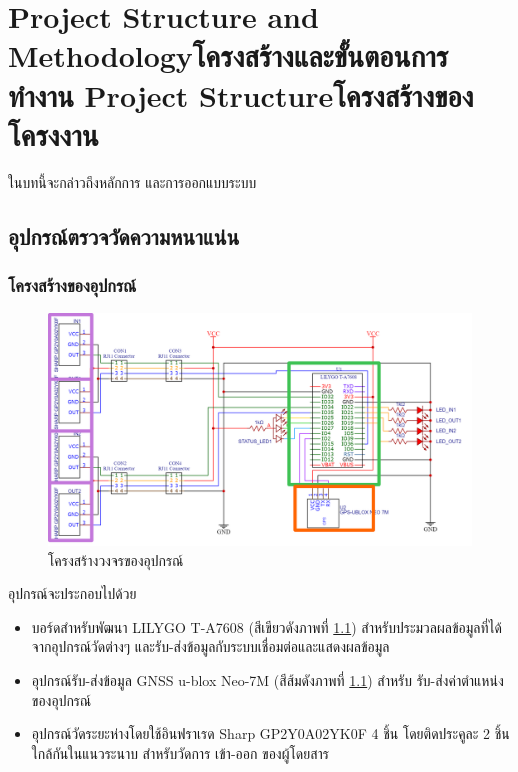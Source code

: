 \chapter{\ifproject%
\ifenglish Project Structure and Methodology\else โครงสร้างและขั้นตอนการทำงาน\fi
\else%
\ifenglish Project Structure\else โครงสร้างของโครงงาน\fi
\fi
}

ในบทนี้จะกล่าวถึงหลักการ และการออกแบบระบบ

\section{อุปกรณ์ตรวจวัดความหนาแน่น}
\subsection{โครงสร้างของอุปกรณ์}
\begin{figure}[h!]
  \begin{center}
    \includegraphics[width=1\textwidth]{schematic-framed.png}
  \end{center}
  \caption{โครงสร้างวงจรของอุปกรณ์}
  \label{fig:schematic-framed}
\end{figure}

อุปกรณ์จะประกอบไปด้วย
\begin{itemize}
  \item บอร์ดสำหรับพัฒนา LILYGO T-A7608 (สีเขียวดังภาพที่ \ref{fig:schematic-framed}) สำหรับประมวลผลข้อมูลที่ได้จากอุปกรณ์วัดต่างๆ และรับ-ส่งข้อมูลกับระบบเชื่อมต่อและแสดงผลข้อมูล
  \item อุปกรณ์รับ-ส่งข้อมูล GNSS u-blox Neo-7M (สีส้มดังภาพที่ \ref{fig:schematic-framed}) สำหรับ รับ-ส่งค่าตำแหน่งของอุปกรณ์
  \item อุปกรณ์วัดระยะห่างโดยใช้อินฟราเรด Sharp GP2Y0A02YK0F 4 ชิ้น โดยติดประคูละ 2 ชิ้น ใกล้กันในแนวระนาบ สำหรับวัดการ เข้า-ออก ของผู้โดยสาร
\end{itemize}

